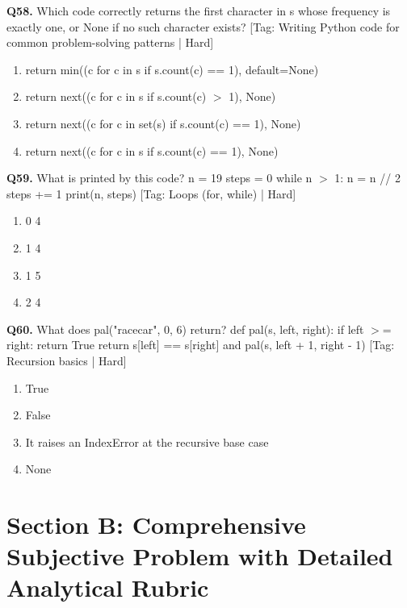 \vspace{2mm}
\noindent\textbf{Q58.} Which code correctly returns the first character in s whose frequency is exactly one, or None if no such character exists? \hfill [Tag: Writing Python code for common problem-solving patterns | Hard]
\begin{enumerate}[label=(\alph*),topsep=2pt,itemsep=1pt,partopsep=0pt,parsep=0pt]
    \item {return min((c for c in s if s.count(c) == 1), default=None)}
    \item {return next((c for c in s if s.count(c) $>$ 1), None)}
    \item {return next((c for c in set(s) if s.count(c) == 1), None)}
    \item {return next((c for c in s if s.count(c) == 1), None)}
\end{enumerate}
\vspace{2mm}
\noindent\textbf{Q59.} What is printed by this code? n = 19 steps = 0 while n $>$ 1: n = n // 2 steps += 1 print(n, steps) \hfill [Tag: Loops (for, while) | Hard]
\begin{enumerate}[label=(\alph*),topsep=2pt,itemsep=1pt,partopsep=0pt,parsep=0pt]
    \item {0 4}
    \item {1 4}
    \item {1 5}
    \item {2 4}
\end{enumerate}
\vspace{2mm}
\noindent\textbf{Q60.} What does pal("racecar", 0, 6) return? def pal(s, left, right): if left $>$= right: return True return s[left] == s[right] and pal(s, left + 1, right - 1) \hfill [Tag: Recursion basics | Hard]
\begin{enumerate}[label=(\alph*),topsep=2pt,itemsep=1pt,partopsep=0pt,parsep=0pt]
    \item {True}
    \item {False}
    \item {It raises an IndexError at the recursive base case}
    \item {None}
\end{enumerate}
\vspace{2mm}

\section{Section B: Comprehensive Subjective Problem with Detailed Analytical Rubric}

